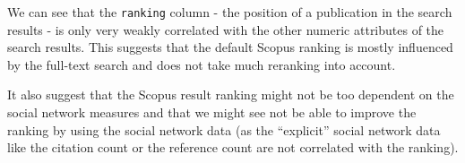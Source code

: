 We can see that the \texttt{ranking} column - the position of a publication in the search results - is only very weakly correlated with the other numeric attributes of the search results.
This suggests that the default Scopus ranking is mostly influenced by the full-text search and does not take much reranking into account.

It also suggest that the Scopus result ranking might not be too dependent on the social network measures and that we might see not be able to improve the ranking by using the social network data (as the ``explicit'' social network data like the citation count or the reference count are not correlated with the ranking).

